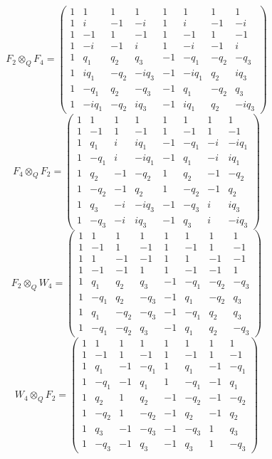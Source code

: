 \documentclass[11pt]{amsart}
\begin{document}
{\small\setlength{\arraycolsep}{3pt}$$F_2\otimes_QF_4=\begin{pmatrix}1 & 1 & 1 & 1 & 1 & 1 & 1 & 1\\ 1 & i & -1 & -i & 1 & i & -1 & -i\\ 1 & -1 & 1 & -1 & 1 & -1 & 1 & -1\\ 1 & -i & -1 & i & 1 & -i & -1 & i\\ 1 & q_{1} & q_{2} & q_{3} & -1 & -q_{1} & -q_{2} & -q_{3}\\ 1 & iq_{1} & -q_{2} & -iq_{3} & -1 & -iq_{1} & q_{2} & iq_{3}\\ 1 & -q_{1} & q_{2} & -q_{3} & -1 & q_{1} & -q_{2} & q_{3}\\ 1 & -iq_{1} & -q_{2} & iq_{3} & -1 & iq_{1} & q_{2} & -iq_{3}\end{pmatrix}$$}
{\small\setlength{\arraycolsep}{3pt}$$F_4\otimes_QF_2=\begin{pmatrix}1 & 1 & 1 & 1 & 1 & 1 & 1 & 1\\ 1 & -1 & 1 & -1 & 1 & -1 & 1 & -1\\ 1 & q_{1} & i & iq_{1} & -1 & -q_{1} & -i & -iq_{1}\\ 1 & -q_{1} & i & -iq_{1} & -1 & q_{1} & -i & iq_{1}\\ 1 & q_{2} & -1 & -q_{2} & 1 & q_{2} & -1 & -q_{2}\\ 1 & -q_{2} & -1 & q_{2} & 1 & -q_{2} & -1 & q_{2}\\ 1 & q_{3} & -i & -iq_{3} & -1 & -q_{3} & i & iq_{3}\\ 1 & -q_{3} & -i & iq_{3} & -1 & q_{3} & i & -iq_{3}\end{pmatrix}$$}
{\small\setlength{\arraycolsep}{3pt}$$F_2\otimes_QW_4=\begin{pmatrix}1 & 1 & 1 & 1 & 1 & 1 & 1 & 1\\ 1 & -1 & 1 & -1 & 1 & -1 & 1 & -1\\ 1 & 1 & -1 & -1 & 1 & 1 & -1 & -1\\ 1 & -1 & -1 & 1 & 1 & -1 & -1 & 1\\ 1 & q_{1} & q_{2} & q_{3} & -1 & -q_{1} & -q_{2} & -q_{3}\\ 1 & -q_{1} & q_{2} & -q_{3} & -1 & q_{1} & -q_{2} & q_{3}\\ 1 & q_{1} & -q_{2} & -q_{3} & -1 & -q_{1} & q_{2} & q_{3}\\ 1 & -q_{1} & -q_{2} & q_{3} & -1 & q_{1} & q_{2} & -q_{3}\end{pmatrix}$$}
{\small\setlength{\arraycolsep}{3pt}$$W_4\otimes_QF_2=\begin{pmatrix}1 & 1 & 1 & 1 & 1 & 1 & 1 & 1\\ 1 & -1 & 1 & -1 & 1 & -1 & 1 & -1\\ 1 & q_{1} & -1 & -q_{1} & 1 & q_{1} & -1 & -q_{1}\\ 1 & -q_{1} & -1 & q_{1} & 1 & -q_{1} & -1 & q_{1}\\ 1 & q_{2} & 1 & q_{2} & -1 & -q_{2} & -1 & -q_{2}\\ 1 & -q_{2} & 1 & -q_{2} & -1 & q_{2} & -1 & q_{2}\\ 1 & q_{3} & -1 & -q_{3} & -1 & -q_{3} & 1 & q_{3}\\ 1 & -q_{3} & -1 & q_{3} & -1 & q_{3} & 1 & -q_{3}\end{pmatrix}$$}
\end{document}
